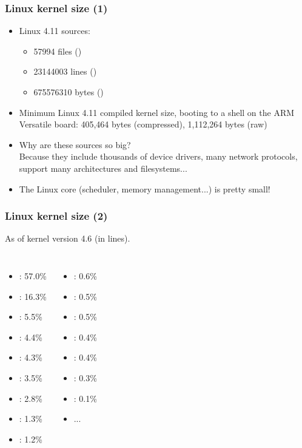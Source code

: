 \begin{frame}
  \frametitle{Linux kernel size (1)}
  \begin{itemize}
  \item Linux 4.11 sources:\\
    \begin{itemize}
	\item 57994 files ()
	\item 23144003 lines ()
	\item 675576310 bytes ()
    \end{itemize}
  \item Minimum Linux 4.11 compiled kernel size,
        booting to a shell on the ARM Versatile board:
    	405,464 bytes (compressed), 1,112,264 bytes (raw)
  \item Why are these sources so big?\\
    Because they include thousands of device drivers, many network
    protocols, support many architectures and filesystems...
  \item The Linux core (scheduler, memory management...) is pretty
    small!
  \end{itemize}
\end{frame}

\begin{frame}
  \frametitle{Linux kernel size (2)}
  As of kernel version 4.6 (in lines).
  \begin{columns}
    \begin{itemize}
    \item {}: 57.0\%
    \item {}: 16.3\%
    \item {}: 5.5\%
    \item {}: 4.4\%
    \item {}: 4.3\%
    \item {}: 3.5\%
    \item {}: 2.8\%
    \item {}: 1.3\%
    \item {}: 1.2\%
    \end{itemize}
    \begin{itemize}
    \item {}: 0.6\%
    \item {}: 0.5\%
    \item {}: 0.5\%
    \item {}: 0.4\%
    \item {}: 0.4\%
    \item {}: 0.3\%
    \item {}: 0.1\%
    \item ...
    \end{itemize}
  \end{columns}
\end{frame}
